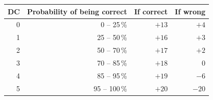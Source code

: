 \vspace{1.2em}
\begin{center}
\renewcommand{\arraystretch}{1.25}
\begin{tabular}{rrrr}
\toprule
\textbf{DC} & \textbf{Probability of being correct} & \textbf{If correct} & \textbf{If wrong}\\
\midrule
0 & 0 -- 25\,\%   & $+13$ & $+4$\\
1 & 25 -- 50\,\%  & $+16$ & $+3$\\
2 & 50 -- 70\,\%  & $+17$ & $+2$\\
3 & 70 -- 85\,\%  & $+18$ & $0$\\
4 & 85 -- 95\,\%  & $+19$ & $-6$\\
5 & 95 -- 100\,\% & $+20$ & $-20$\\
\bottomrule
\end{tabular}
\end{center}
